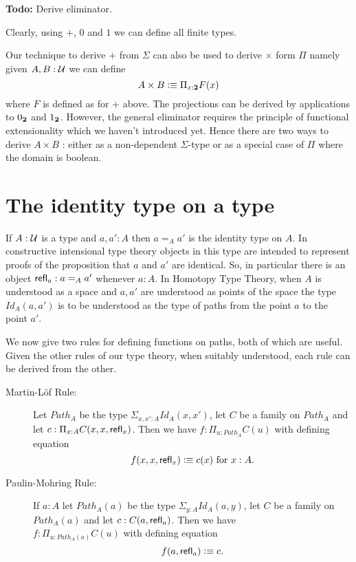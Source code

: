 \textbf{Todo:} Derive eliminator.

Clearly, using $+$, $0$ and $1$ we can define all finite types.

Our technique to derive $+$ from $\Sigma$ can also be used to derive
$\times$ form $\Pi$ namely given $A,B:\mathcal{U}$ we can define 
\[ A \times B \vcentcolon\equiv \Pi_{x:\mathbf{2}}F(x)\]
where $F$ is defined as for $+$ above. The projections can be derived
by applications to $0_{\mathbf{2}}$ and $1_{\mathbf{2}}$. However, the general
eliminator requires the principle of functional extensionality which
we haven't introduced yet. Hence there are two ways to derive $A\times
B$ : either as a non-dependent $\Sigma$-type or as a special case of
$\Pi$ where the domain is boolean. 

\section{The identity type on a type}
\label{sec:identity-types}

If $A:\mathcal{U}$ is a type and $a,a':A$ then $a =_A a'$ is the identity type on $A$.  
In constructive intensional type theory objects in this type are
intended to represent proofs of the proposition that $a$ and $a'$ are
identical.  So, in particular there is an object $\mathsf{refl}_{a}: a =_A a'$ whenever $a:A$.  In Homotopy Type Theory, when $A$ is understood as a space and $a,a'$ are understood as points of the space the type $Id_A(a,a')$ is to be understood as the type of paths from the point $a$ to the point $a'$.

We now give two rules for defining functions on paths, both of which are useful.  Given the other rules of our type theory, when suitably understood, each rule can be derived from the other. 

\begin{description}
\item[Martin-L\"{o}f Rule:] Let $Path_A$ be the type $\Sigma_{x,x':A}Id_A(x,x')$, let $C$ be a family on $Path_A$ and let $c:\Pi_{x:A}C(x,x,\mathsf{refl}_{x})$.  Then we have $f:\Pi_{u:Path_A}C(u)$ with defining equation
  \[ f(x,x,\mathsf{refl}_{x})\vcentcolon\equiv c(x)\mbox{ for } x:A.\]
\item[Paulin-Mohring Rule:] If $a:A$ let $Path_A(a)$ be the type $\Sigma_{y:A}Id_A(a,y)$, let $C$ be a family on $Path_A(a)$ and let $c:C(a,\mathsf{refl}_{a})$. Then we have\\ $f:\Pi_{u:Path_A(a)}C(u)$ with defining equation
    \[ f(a,\mathsf{refl}_{a})\vcentcolon\equiv c.\]
\end{description}

